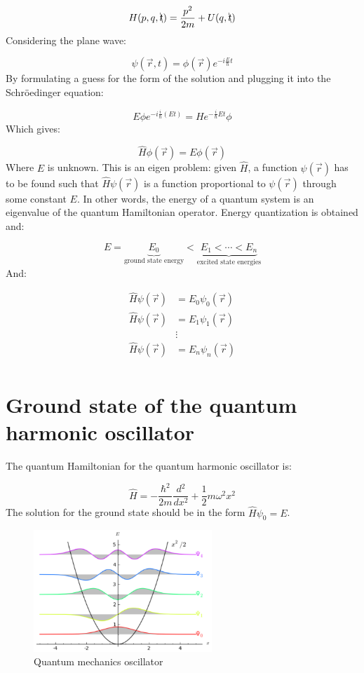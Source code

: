 $$H(p,q, \bcancel{t}) = \frac{p^2}{2m}+U(q,\bcancel{t})$$
\noindent
Considering the plane wave:

$$\psi(\vec{r}, t) = \phi(\vec{r}) e^{-i \frac{E}{\hbar}t}$$
\noindent
By formulating a guess for the form of the solution and plugging it into the Schr\"oedinger equation:

$$E\phi e^{-i \frac{i}{\hbar}(Et)} = He^{-\frac{i}{\hbar}Et}\phi$$
\noindent
Which gives:

$$\hat{H}\phi(\vec{r}) = E\phi(\vec{r})$$
\noindent
Where $E$ is unknown.
This is an eigen problem: given $\hat{H}$, a function $\psi(\vec{r})$ has to be found such that $\hat{H}\psi(\vec{r})$ is a function proportional to $\psi(\vec{r})$ through some constant $E$.
In other words, the energy of a quantum system is an eigenvalue of the quantum Hamiltonian operator.
Energy quantization is obtained and:

$$E = \underbrace{E_0}_{\text{ground state energy}} < \underbrace{E_1 < \cdots < E_n}_{\text{excited state energies}}$$
\noindent
And:

\begin{align*}
  \hat{H}\psi(\vec{r}) &= E_0\psi_0(\vec{r})\\
  \hat{H}\psi(\vec{r}) &= E_1\psi_1(\vec{r})\\
                       &\vdots\\
  \hat{H}\psi(\vec{r}) &= E_n\psi_n(\vec{r})\\
\end{align*}

\section{Ground state of the quantum harmonic oscillator}
The quantum Hamiltonian for the quantum harmonic oscillator is:

$$\hat{H} = - \frac{\hbar^2}{2m}\frac{d{^2}}{d{x^2}} +\frac{1}{2}m\omega^2 x^2$$
\noindent
The solution for the ground state should be in the form $\hat{H}\psi_0 = E$.
\begin{figure}[h!]
    \centering
    \includegraphics[clip, width=0.6\textwidth]{qm_oscillator.png}
    \caption{\label{fig:qm_oscillator} Quantum mechanics oscillator }
\end{figure}
